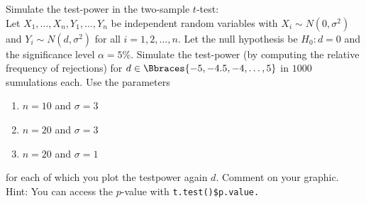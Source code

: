 
\begin{exercise}

Simulate the test-power in the two-sample $t$-test: \\
Let $X_1, \dots, X_n, Y_1, \dots, Y_n$ be independent random variables with $X_i \sim N(0, \sigma^2)$ and $Y_i \sim N(d, \sigma^2)$ for all $i = 1, 2, \dots, n$.
Let the null hypothesis be $H_0: d = 0$ and the significance level $\alpha = 5 \%$.
Simulate the test-power (by computing the relative frequency of rejections) for $d \in \Bbraces{-5, -4.5, -4, \dots, 5}$ in $1000$ sumulations each.
Use the parameters

\begin{enumerate}[label = (\alph*)]
    \item $n = 10$ and $\sigma = 3$
    \item $n = 20$ and $\sigma = 3$
    \item $n = 20$ and $\sigma = 1$
\end{enumerate}

for each of which you plot the testpower again $d$.
Comment on your graphic.
Hint:
You can access the $p$-value with \texttt{t.test()\$p.value.}

\end{exercise}


